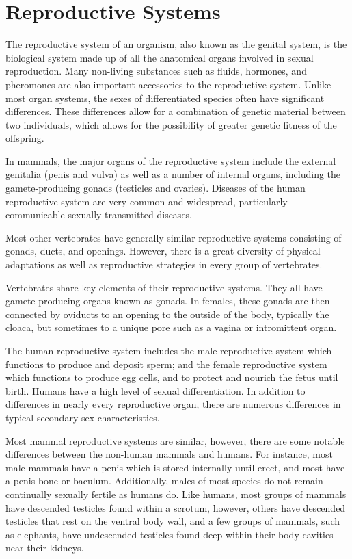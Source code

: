 \hypertarget{reproductive-systems}{%
\chapter{Reproductive Systems}\label{reproductive-systems}}

The reproductive system of an organism, also known as the genital system, is the biological system made up of all the anatomical organs involved in sexual reproduction. Many non-living substances such as fluids, hormones, and pheromones are also important accessories to the reproductive system. Unlike most organ systems, the sexes of differentiated species often have significant differences. These differences allow for a combination of genetic material between two individuals, which allows for the possibility of greater genetic fitness of the offspring.

In mammals, the major organs of the reproductive system include the external genitalia (penis and vulva) as well as a number of internal organs, including the gamete-producing gonads (testicles and ovaries). Diseases of the human reproductive system are very common and widespread, particularly communicable sexually transmitted diseases.

Most other vertebrates have generally similar reproductive systems consisting of gonads, ducts, and openings. However, there is a great diversity of physical adaptations as well as reproductive strategies in every group of vertebrates.

Vertebrates share key elements of their reproductive systems. They all have gamete-producing organs known as gonads. In females, these gonads are then connected by oviducts to an opening to the outside of the body, typically the cloaca, but sometimes to a unique pore such as a vagina or intromittent organ.

The human reproductive system includes the male reproductive system which functions to produce and deposit sperm; and the female reproductive system which functions to produce egg cells, and to protect and nourich the fetus until birth. Humans have a high level of sexual differentiation. In addition to differences in nearly every reproductive organ, there are numerous differences in typical secondary sex characteristics.

Most mammal reproductive systems are similar, however, there are some notable differences between the non-human mammals and humans. For instance, most male mammals have a penis which is stored internally until erect, and most have a penis bone or baculum. Additionally, males of most species do not remain continually sexually fertile as humans do. Like humans, most groups of mammals have descended testicles found within a scrotum, however, others have descended testicles that rest on the ventral body wall, and a few groups of mammals, such as elephants, have undescended testicles found deep within their body cavities near their kidneys.

